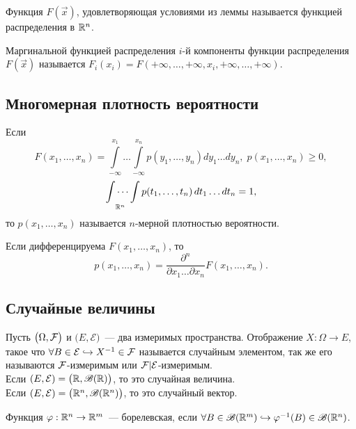 \begin{definition}
	Функция $F(\vec x)$, удовлетворяющая условиями из леммы называется функцией распределения в $\mathbb{R}^n$.
\end{definition}

\begin{definition}
    Маргинальной функцией распределения $i$-й компоненты функции распределения $F(\vec x)$ называется $F_i (x_i) = F(+\infty, \dots, +\infty, x_i, +\infty, \dots, +\infty)$.
\end{definition}

\subsection{Многомерная плотность вероятности}
\begin{definition}
	Если 
	$$ F(x_1, \ldots, x_n) = \int\limits_{-\infty}^{x_1}\dots\int\limits_{-\infty}^{x_n} p(y_1, \ldots, y_n)dy_1\ldots dy_n,\; p(x_1, \ldots, x_n) \geqslant 0, $$
	$$ \idotsint\limits_{\mathbb{R}^n} p(t_1, \dots, t_n) \,dt_1 \dots dt_n = 1,$$
	то $p(x_1, \ldots, x_n)$ называется $n$-мерной плотностью вероятности.
	
	Если дифференцируема $F(x_1, \dots, x_n)$, то
	$$ p(x_1, \ldots, x_n) = \frac{\partial^n}{\partial x_1\ldots\partial x_n}F(x_1, \ldots, x_n). $$
\end{definition}

\subsection{Случайные величины}
\begin{definition}
	Пусть $\big(\Omega, \mathcal{F} \big)$ и $\big( E, \mathcal{E} \big)$~--- два измеримых пространства. Отображение $X: \Omega \rightarrow E$, такое что $\forall B \in \mathcal{E} \hookrightarrow X^{-1} \in \mathcal{F}$  называется случайным элементом, так же его называются $\mathcal{F}$-измеримым или $\mathcal{F}|\mathcal{E}$-измеримым. \\
	Если $(E, \mathcal{E}) = \big(\mathbb{R}, \mathscr{B}(\mathbb{R})\big)$, то это случайная величина. \\
	Если $(E, \mathcal{E}) = \big(\mathbb{R}^n, \mathscr{B}(\mathbb{R}^n)\big)$, то это случайный вектор.
\end{definition}

\begin{definition}
	Функция $\varphi: \mathbb{R}^n \rightarrow \mathbb{R}^m$~--- борелевская, если $\forall B \in \mathscr{B}(\mathbb{R}^m) \hookrightarrow \varphi^{-1}(B) \in \mathscr{B}(\mathbb{R}^n)$. 
\end{definition}

